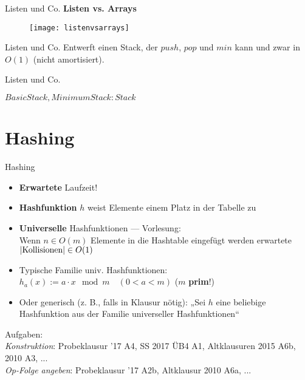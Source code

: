 \begin{frame}{Listen und Co.}
	\textbf{Listen vs. Arrays}
	\begin{figure}[htp]
		\centering
		\texttt{[image: listenvsarrays]}
	\end{figure}
\end{frame}

\begin{frame}{Listen und Co.}
	\taskheading{}
	Entwerft einen Stack, der $push$, $pop$ und $min$ kann und zwar in $O(1)$ (nicht amortisiert).
\end{frame}

\begin{frame}{Listen und Co.}
	\solutionheading
	\begin{algorithm}[H]
		$BasicStack, MinimumStack: Stack$ \;
		\;
		\;
		\;
	\end{algorithm}
\end{frame}


\section{Hashing}

\begin{frame}{Hashing}
	\begin{itemize}
		\item \textbf{Erwartete} Laufzeit!
		\item \textbf{Hashfunktion} $h$ weist Elemente einem Platz in der Tabelle zu 
		\item \textbf{Universelle} Hashfunktionen \quad --- \quad  Vorlesung: \\
		Wenn $n \in O(m)$ Elemente in die Hashtable eingefügt werden \impl erwartete $\left|\text{Kollisionen}\right| \in O(1)$ 
		\item Typische Familie univ. Hashfunktionen: \\
		$h_a(x) := a \cdot x \mod m \quad (0 < a < m)$ \quad ($m$ \textbf{prim}!)
		\item Oder generisch (z. B., falls in Klausur nötig): „Sei $h$ eine beliebige Hashfunktion aus der Familie universeller Hashfunktionen“
	\end{itemize}
	\bigskip
	\small Aufgaben: \\
	\hanging \emph{Konstruktion}: Probeklausur '17 A4, SS 2017 ÜB4 A1, Altklausuren 2015 A6b, 2010 A3, ... \\
	\emph{Op-Folge angeben}: Probeklausur '17 A2b, Altklausur 2010 A6a, ...
\end{frame}	

